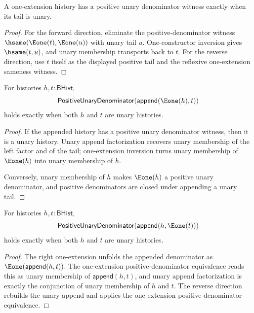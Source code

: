 \begin{theorem}
\label{thm:rat-positive-unary-denominator-eone-iff-unary}
A one-extension history has a positive unary denominator witness exactly when
its tail is unary.
\end{theorem}
\begin{proof}
For the forward direction, eliminate the positive-denominator witness
\(\hsame(\Eone(t),\Eone(u))\) with unary tail \(u\). One-constructor inversion
gives \(\hsame(t,u)\), and unary membership transports back to \(t\). For the
reverse direction, use \(t\) itself as the displayed positive tail and the
reflexive one-extension sameness witness.
\end{proof}

\begin{theorem}
\label{thm:rat-positive-denominator-append-eone-left-exact}
For histories $h,t:\mathsf{BHist}$,
$$
\mathsf{PositiveUnaryDenominator}(\mathsf{append}(\Eone(h),t))
$$
holds exactly when both $h$ and $t$ are unary histories.
\end{theorem}
\begin{proof}
If the appended history has a positive unary denominator witness, then it is a
unary history. Unary append factorization recovers unary membership of the
left factor and of the tail; one-extension inversion turns unary membership of
$\Eone(h)$ into unary membership of $h$.

Conversely, unary membership of $h$ makes $\Eone(h)$ a positive unary
denominator, and positive denominators are closed under appending a unary
tail.
\end{proof}

\begin{theorem}
\label{thm:rat-positive-denominator-append-eone-right-exact}
For histories $h,t:\mathsf{BHist}$,
$$
\mathsf{PositiveUnaryDenominator}(\mathsf{append}(h,\Eone(t)))
$$
holds exactly when both $h$ and $t$ are unary histories.
\end{theorem}
\begin{proof}
The right one-extension unfolds the appended denominator as
$\Eone(\mathsf{append}(h,t))$. The one-extension positive-denominator
equivalence reads this as unary membership of $\mathsf{append}(h,t)$, and
unary append factorization is exactly the conjunction of unary membership of
$h$ and $t$. The reverse direction rebuilds the unary append and applies
the one-extension positive-denominator equivalence.
\end{proof}

